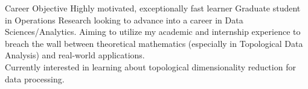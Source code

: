 
\begin{rSection}{Career Objective}
    Highly motivated, exceptionally fast learner Graduate student in Operations Research looking to advance into a career in Data Sciences/Analytics.
    Aiming to utilize my academic and internship experience to breach the wall between theoretical mathematics (especially in Topological Data Analysis) and real-world applications.\\
    Currently interested in learning about topological dimensionality reduction for data processing.
\end{rSection}